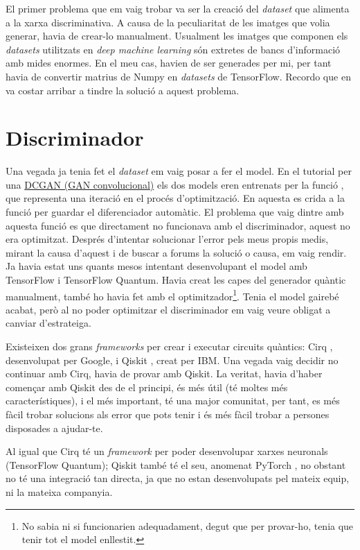 El primer problema que em vaig trobar va ser la creació del \textit{dataset} que alimenta a la xarxa discriminativa. A causa de la peculiaritat de les imatges que volia generar, havia de crear-lo manualment. Usualment les imatges que componen els \textit{datasets} utilitzats en \textit{deep machine learning} són extretes de bancs d'informació amb mides enormes. En el meu cas, havien de ser generades per mi, per tant havia de convertir matrius de Numpy en \textit{datasets} de TensorFlow. Recordo que en va costar arribar a tindre la solució a aquest problema. 

\section{Discriminador}

Una vegada ja tenia fet el \textit{dataset} em vaig posar a fer el model. En el tutorial per una \href{https://www.tensorflow.org/tutorials/generative/dcgan}{DCGAN (GAN convolucional)} els dos models eren entrenats per la funció , que representa una iteració en el procés d'optimització. En aquesta es crida a la funció  per guardar el diferenciador automàtic. El problema que vaig dintre amb aquesta funció es que directament no funcionava amb el discriminador, aquest no era optimitzat. Després d'intentar solucionar l'error pels meus propis medis, mirant la causa d'aquest i de buscar a forums la solució o causa, em vaig rendir. Ja havia estat uns quants mesos intentant desenvolupant el model amb TensorFlow i TensorFlow Quantum. Havia creat les capes del generador quàntic manualment, també ho havia fet amb el optimitzador\footnote{No sabia ni si funcionarien adequadament, degut que per provar-ho, tenia que tenir tot el model enllestit.}. Tenia el model gairebé acabat, però al no poder optimitzar el discriminador em vaig veure obligat a canviar d'estrateiga. 

Existeixen dos grans \textit{frameworks} per crear i executar circuits quàntics: Cirq \cite{cirq}, desenvolupat per Google, i Qiskit \cite{qiskit}, creat per IBM. Una vegada vaig decidir no continuar amb Cirq, havia de provar amb Qiskit. La veritat, havia d'haber començar amb Qiskit des de el principi, és més útil (té moltes més característiques), i el més important, té una major comunitat, per tant, es més fàcil trobar solucions als error que pots tenir i és més fàcil trobar a persones disposades a ajudar-te.

Al igual que Cirq té un \textit{framework} per poder desenvolupar xarxes neuronals (TensorFlow Quantum); Qiskit també té el seu, anomenat PyTorch \cite{pytorch_2019}, no obstant no té una integració tan directa, ja que no estan desenvolupats pel mateix equip, ni la mateixa companyia. 

